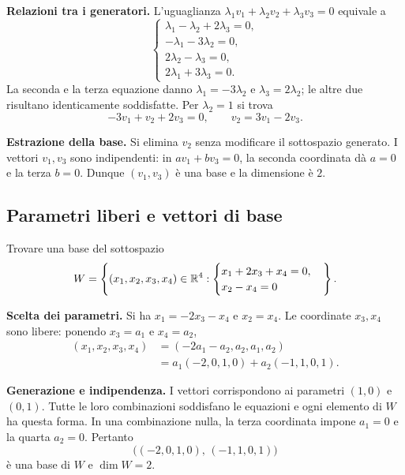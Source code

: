 \begin{svolgimento}
\textbf{Relazioni tra i generatori.} L'uguaglianza $\lambda_1v_1+\lambda_2v_2+\lambda_3v_3=0$ equivale a
\[
  \begin{cases}
    \lambda_1-\lambda_2+2\lambda_3=0,\\
    -\lambda_1-3\lambda_2=0,\\
    2\lambda_2-\lambda_3=0,\\
    2\lambda_1+3\lambda_3=0.
  \end{cases}
\]
La seconda e la terza equazione danno $\lambda_1=-3\lambda_2$ e $\lambda_3=2\lambda_2$; le altre due risultano identicamente soddisfatte. Per $\lambda_2=1$ si trova
\[
  -3v_1+v_2+2v_3=0,\qquad v_2=3v_1-2v_3.
\]

\textbf{Estrazione della base.} Si elimina $v_2$ senza modificare il sottospazio generato. I vettori $v_1,v_3$ sono indipendenti: in $av_1+bv_3=0$, la seconda coordinata dà $a=0$ e la terza $b=0$. Dunque $(v_1,v_3)$ è una base e la dimensione è $2$.
\end{svolgimento}

\subsection{Parametri liberi e vettori di base}

\begin{esercizio}
Trovare una base del sottospazio
\[
  W=\left\{(x_1,x_2,x_3,x_4)\in\mathbb{R}^4:
  \begin{cases}
    x_1+2x_3+x_4=0,\\
    x_2-x_4=0
  \end{cases}\right\}.
\]
\end{esercizio}

\begin{svolgimento}
\textbf{Scelta dei parametri.} Si ha $x_1=-2x_3-x_4$ e $x_2=x_4$. Le coordinate $x_3,x_4$ sono libere: ponendo $x_3=a_1$ e $x_4=a_2$,
\begin{align*}
  (x_1,x_2,x_3,x_4)
  &=(-2a_1-a_2,a_2,a_1,a_2)\\
  &=a_1(-2,0,1,0)+a_2(-1,1,0,1).
\end{align*}

\textbf{Generazione e indipendenza.} I vettori corrispondono ai parametri $(1,0)$ e $(0,1)$. Tutte le loro combinazioni soddisfano le equazioni e ogni elemento di $W$ ha questa forma. In una combinazione nulla, la terza coordinata impone $a_1=0$ e la quarta $a_2=0$. Pertanto
\[
  \bigl((-2,0,1,0),\,(-1,1,0,1)\bigr)
\]
è una base di $W$ e $\dim W=2$.
\end{svolgimento}

